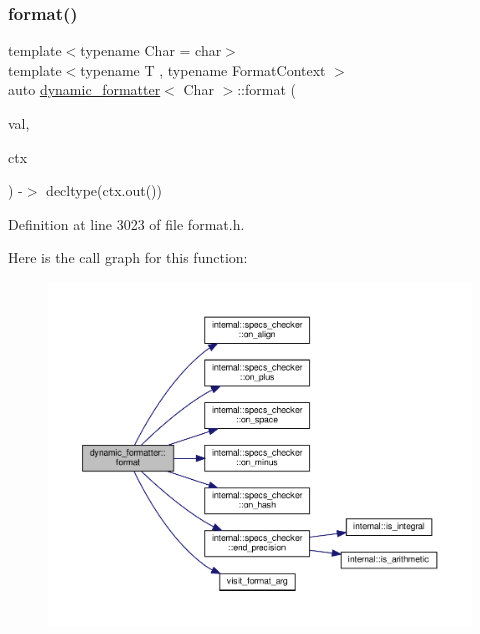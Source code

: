 \subsubsection{\texorpdfstring{format()}{format()}}
{\footnotesize\ttfamily template$<$typename Char  = char$>$ \\
template$<$typename T , typename Format\+Context $>$ \\
auto \hyperlink{classdynamic__formatter}{dynamic\+\_\+formatter}$<$ Char $>$\+::format (\begin{DoxyParamCaption}\item[{const T \&}]{val,  }\item[{Format\+Context \&}]{ctx }\end{DoxyParamCaption}) -\/$>$ decltype(ctx.\+out()) \hspace{0.3cm}{\ttfamily [inline]}}



Definition at line 3023 of file format.\+h.

Here is the call graph for this function\+:
\nopagebreak
\begin{figure}[H]
\begin{center}
\leavevmode
\includegraphics[width=350pt]{classdynamic__formatter_ad409c112b5d8058d65e3b96d20c4a524_cgraph}
\end{center}
\end{figure}
\mbox{\label{classdynamic__formatter_aa9bc96ae30462d4e5f13d207f957fc0b}} 
